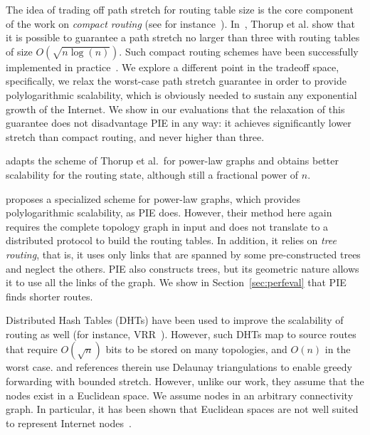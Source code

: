 \documentclass[conference]{IEEEtran}
\begin{document}
The idea of trading off path stretch for routing table size is the core component of the work on {\em compact routing} (see for instance~\cite{krioukov:sigcomm}). In~\cite{thorup:compact},
Thorup et al.
show that it is possible to guarantee a path stretch no larger than three with routing tables of size $O(\sqrt{n \log(n)})$. Such compact routing schemes have been successfully implemented in practice~\cite{mao:S4,singla2010}. We explore a different point in the tradeoff space, specifically, we relax the worst-case path stretch guarantee in order to provide polylogarithmic scalability, which is obviously needed to sustain any exponential growth of the Internet. We show in our evaluations that the relaxation of this guarantee does not disadvantage PIE in any way: it achieves significantly lower stretch than compact routing, and never higher than three.



\cite{Chen:compact} adapts the scheme of Thorup et al.\ for power-law graphs and obtains better scalability for the routing state, although still a fractional power of $n$.

\cite{brady} proposes a specialized scheme for power-law graphs, which provides polylogarithmic scalability, as PIE does. However, their method here again requires the complete topology graph in input and does not translate to a distributed protocol to build the routing tables.
In addition, it relies on \emph{tree routing}, that is, it uses only links that are spanned by some pre-constructed trees and neglect the others. PIE also constructs trees, but its geometric nature allows it to use all the links of the graph. We show in Section~\ref{sec:perfeval} that PIE finds shorter routes.









Distributed Hash Tables (DHTs) have been used to improve the scalability of routing as well (for instance, VRR~\cite{caesar:VRR}). However, such DHTs map to source routes that require $O(\sqrt{n})$ bits to be stored on many topologies, and $O(n)$ in the worst case. \cite{ghaffari:delaunay} and references therein use Delaunay triangulations to enable greedy forwarding with bounded stretch. However, unlike our work, they assume that the nodes exist in a Euclidean space. We assume nodes in an arbitrary connectivity graph. In particular, it has been shown that Euclidean spaces are not well suited to represent Internet nodes~\cite{lee:euclidean}.
\end{document}
